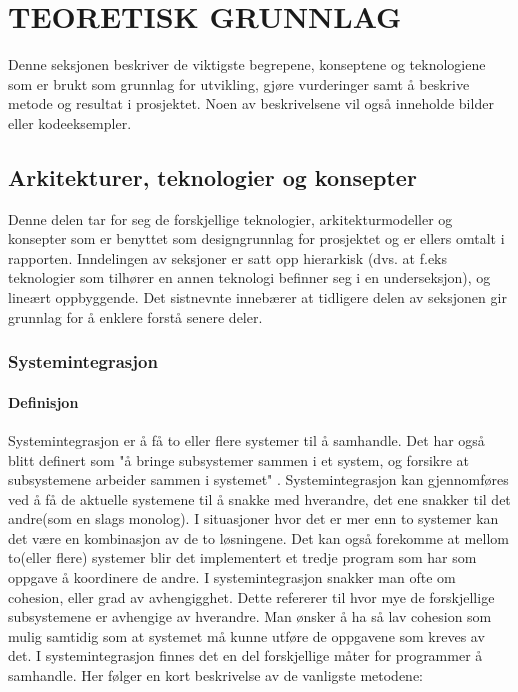 \documentclass[../main.tex]{subfiles}
\begin{document}
\chapter{TEORETISK GRUNNLAG}

Denne seksjonen beskriver de viktigste begrepene, konseptene og teknologiene som er brukt som grunnlag for utvikling, gjøre vurderinger samt å beskrive metode og resultat i prosjektet. Noen av beskrivelsene vil også inneholde bilder eller kodeeksempler.

\section{Arkitekturer, teknologier og konsepter}

Denne delen tar for seg de forskjellige teknologier, arkitekturmodeller og konsepter som er benyttet som designgrunnlag for prosjektet og er ellers omtalt i rapporten. Inndelingen av seksjoner er satt opp hierarkisk (dvs. at f.eks teknologier som tilhører en annen teknologi befinner seg i en underseksjon), og lineært oppbyggende. Det sistnevnte innebærer at tidligere delen av seksjonen gir grunnlag for å enklere forstå senere deler.

\subsection{Systemintegrasjon}

\subsubsection{Definisjon}
Systemintegrasjon er å få to eller flere systemer til å samhandle. Det har også blitt definert som "å bringe subsystemer sammen i et system, og forsikre at subsystemene arbeider sammen i systemet" . \newline
\newline
Systemintegrasjon kan gjennomføres ved å få de aktuelle systemene til å snakke med hverandre, det ene snakker til det andre(som en slags monolog). I situasjoner hvor det er mer enn to systemer kan det være en kombinasjon av de to løsningene. Det kan også forekomme at mellom to(eller flere) systemer blir det implementert et tredje program som har som oppgave å koordinere de andre.\newline
\newline
I systemintegrasjon snakker man ofte om cohesion, eller grad av avhengigghet. Dette refererer til hvor mye de forskjellige subsystemene er avhengige av hverandre. Man ønsker å ha så lav cohesion som mulig samtidig som at systemet må kunne utføre de oppgavene som kreves av det. \newline
\newline
I systemintegrasjon finnes det en del forskjellige måter for programmer å samhandle. Her følger en kort beskrivelse av de vanligste metodene:
\end{document}
